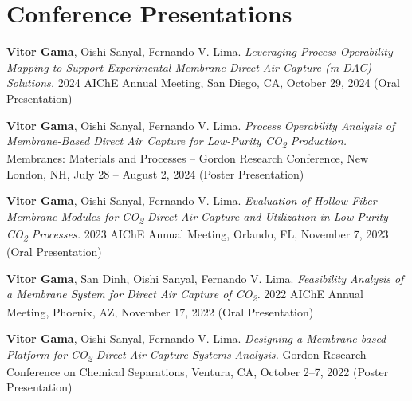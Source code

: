 \documentclass[letterpaper,11pt]{article}
\begin{document}
 \section*{Conference Presentations}
 \begin{enumerate}[leftmargin=*, label={[\arabic*]}]
 
   \item \textbf{Vitor Gama}, Oishi Sanyal, Fernando V. Lima. 
     \textit{Leveraging Process Operability Mapping to Support Experimental Membrane Direct Air Capture (m-DAC) Solutions.} 
     2024 AIChE Annual Meeting, San Diego, CA, October 29, 2024 
     (Oral Presentation)
 
   \item \textbf{Vitor Gama}, Oishi Sanyal, Fernando V. Lima.
     \textit{Process Operability Analysis of Membrane-Based Direct Air Capture for Low-Purity CO\textsubscript{2} Production.}
     Membranes: Materials and Processes – Gordon Research Conference, New London, NH, July 28 – August 2, 2024 
     (Poster Presentation)
 
   \item \textbf{Vitor Gama}, Oishi Sanyal, Fernando V. Lima.
     \textit{Evaluation of Hollow Fiber Membrane Modules for CO\textsubscript{2} Direct Air Capture and Utilization in Low-Purity CO\textsubscript{2} Processes.}
     2023 AIChE Annual Meeting, Orlando, FL, November 7, 2023 
     (Oral Presentation)
 
   \item \textbf{Vitor Gama}, San Dinh, Oishi Sanyal, Fernando V. Lima.
     \textit{Feasibility Analysis of a Membrane System for Direct Air Capture of CO\textsubscript{2}.}
     2022 AIChE Annual Meeting, Phoenix, AZ, November 17, 2022 
     (Oral Presentation)
 
   \item \textbf{Vitor Gama}, Oishi Sanyal, Fernando V. Lima.
     \textit{Designing a Membrane-based Platform for CO\textsubscript{2} Direct Air Capture Systems Analysis.}
     Gordon Research Conference on Chemical Separations, Ventura, CA, October 2–7, 2022 
     (Poster Presentation)
 
 \end{enumerate}
 

\end{document}
